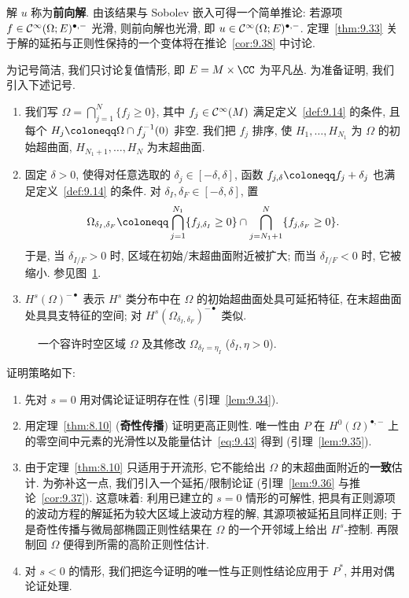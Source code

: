解 $u$ 称为\textbf{前向解}. 由该结果与 Sobolev 嵌入可得一个简单推论: 若源项 $f \in \mathcal{C}^\infty(\Omega; E)^{\bullet,-}$ 光滑, 则前向解也光滑, 即 $u \in \mathcal{C}^\infty(\Omega; E)^{\bullet,-}$. 定理~\ref{thm:9.33} 关于解的延拓与正则性保持的一个变体将在推论~\ref{cor:9.38} 中讨论.

为记号简洁, 我们只讨论复值情形, 即 $E = M \times \CC$ 为平凡丛. 为准备证明, 我们引入下述记号.

\begin{enumerate}
    \item 我们写 $\Omega = \bigcap_{j=1}^{N} \{f_j \ge 0\}$, 其中 $f_j \in \mathcal{C}^\infty(M)$ 满足定义~\ref{def:9.14} 的条件, 且每个 $H_j \defeq \Omega \cap f_j^{-1}(0)$ 非空. 我们把 $f_j$ 排序, 使 $H_1, \ldots, H_{N_1}$ 为 $\Omega$ 的初始超曲面, $H_{N_1+1}, \ldots, H_N$ 为末超曲面.
    \item 固定 $\delta > 0$, 使得对任意选取的 $\delta_j \in [-\delta, \delta]$, 函数 $f_{j,\delta} \defeq f_j + \delta_j$ 也满足定义~\ref{def:9.14} 的条件. 对 $\delta_I, \delta_F \in [-\delta, \delta]$, 置
    \begin{equation}\label{eq:9.96}
        \Omega_{\delta_I, \delta_F} \defeq \bigcap_{j=1}^{N_1} \{f_{j,\delta_I} \ge 0\} \cap \bigcap_{j=N_1+1}^{N} \{f_{j,\delta_F} \ge 0\}.
    \end{equation}
    于是, 当 $\delta_{I/F} > 0$ 时, 区域在初始/末超曲面附近被扩大; 而当 $\delta_{I/F} < 0$ 时, 它被缩小. 参见图~\ref{fig:9.3}.
    \item $H^s(\Omega)^{- \bullet}$ 表示 $H^s$ 类分布中在 $\Omega$ 的初始超曲面处具可延拓特征, 在末超曲面处具具支特征的空间; 对 $H^s(\Omega_{\delta_I, \delta_F})^{- \bullet}$ 类似.
\end{enumerate}

\begin{figure}[htbp]
\centering
\drawFigNineThree
\caption{一个容许时空区域 $\Omega$ 及其修改 $\Omega_{\delta_I = \eta_I}$ ($\delta_I, \eta > 0$).}\label{fig:9.3}
\end{figure}

证明策略如下:
\begin{enumerate}
    \item 先对 $s = 0$ 用对偶论证证明存在性 (引理~\ref{lem:9.34}).
    \item 用定理~\ref{thm:8.10} (\textbf{奇性传播}) 证明更高正则性. 唯一性由 $P$ 在 $H^0(\Omega)^{\bullet,-}$ 上的零空间中元素的光滑性以及能量估计~\eqref{eq:9.43} 得到 (引理~\ref{lem:9.35}).
    \item 由于定理~\ref{thm:8.10} 只适用于开流形, 它不能给出 $\Omega$ 的末超曲面附近的\textbf{一致}估计. 为弥补这一点, 我们引入一个延拓/限制论证 (引理~\ref{lem:9.36} 与推论~\ref{cor:9.37}). 这意味着: 利用已建立的 $s = 0$ 情形的可解性, 把具有正则源项的波动方程的解延拓为较大区域上波动方程的解, 其源项被延拓且同样正则; 于是奇性传播与微局部椭圆正则性结果在 $\Omega$ 的一个开邻域上给出 $H^s$-控制. 再限制回 $\Omega$ 便得到所需的高阶正则性估计.
    \item 对 $s < 0$ 的情形, 我们把迄今证明的唯一性与正则性结论应用于 $P^*$, 并用对偶论证处理.
\end{enumerate}

